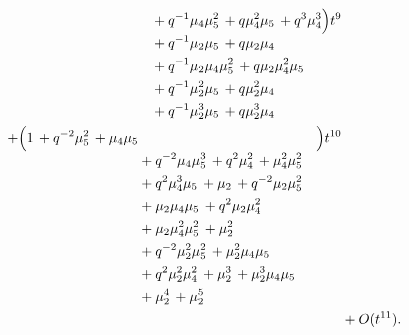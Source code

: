 \documentclass[10pt]{article}
\begin{document}
\[\begin{aligned}
\begin{aligned}[t]
  &{}+q^{-1}\mu_{4}\mu_{5}^{2}\,+q\mu_{4}^{2}\mu_{5}\,+q^{3}\mu_{4}^{3} \\
  &{}+q^{-1}\mu_{2}\mu_{5}\,+q\mu_{2}\mu_{4} \\
  &{}+q^{-1}\mu_{2}\mu_{4}\mu_{5}^{2}\,+q\mu_{2}\mu_{4}^{2}\mu_{5} \\
  &{}+q^{-1}\mu_{2}^{2}\mu_{5}\,+q\mu_{2}^{2}\mu_{4} \\
  &{}+q^{-1}\mu_{2}^{3}\mu_{5}\,+q\mu_{2}^{3}\mu_{4}\end{aligned}\Bigr)t^{9} \\
  + \Bigl(\begin{aligned}[t]1\,+q^{-2}\mu_{5}^{2}\,+\mu_{4}\mu_{5} \\
  &{}+q^{-2}\mu_{4}\mu_{5}^{3}\,+q^{2}\mu_{4}^{2}\,+\mu_{4}^{2}\mu_{5}^{2} \\
  &{}+q^{2}\mu_{4}^{3}\mu_{5}\,+\mu_{2}\,+q^{-2}\mu_{2}\mu_{5}^{2} \\
  &{}+\mu_{2}\mu_{4}\mu_{5}\,+q^{2}\mu_{2}\mu_{4}^{2} \\
  &{}+\mu_{2}\mu_{4}^{2}\mu_{5}^{2}\,+\mu_{2}^{2} \\
  &{}+q^{-2}\mu_{2}^{2}\mu_{5}^{2}\,+\mu_{2}^{2}\mu_{4}\mu_{5} \\
  &{}+q^{2}\mu_{2}^{2}\mu_{4}^{2}\,+\mu_{2}^{3}\,+\mu_{2}^{3}\mu_{4}\mu_{5} \\
  &{}+\mu_{2}^{4}\,+\mu_{2}^{5}\end{aligned}\Bigr)t^{10} \\
  &+ O(t^{11}).
\end{aligned}
\]
\end{document}
